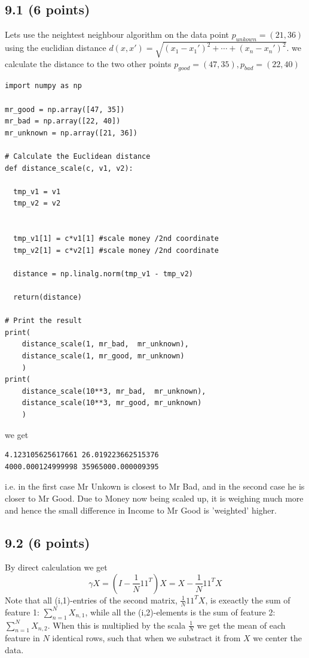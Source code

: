 \documentclass[a4paper,12pt]{article}
\begin{document}
\subsection{9.1 (6 points)}
Lets use the neightest neighbour algorithm on the data point $p_{unkown} = (21, 36)$
using the euclidian distance $d(x,x') = \sqrt{(x_1 - x_1')^2 + \cdots + (x_n - x_n')^2}$. we calculate the distance to the two other points $p_{good} = (47, 35), p_{bad} = (22, 40)$

\begin{lstlisting}
import numpy as np

mr_good = np.array([47, 35])
mr_bad = np.array([22, 40])
mr_unknown = np.array([21, 36])

# Calculate the Euclidean distance
def distance_scale(c, v1, v2):

  tmp_v1 = v1
  tmp_v2 = v2


  tmp_v1[1] = c*v1[1] #scale money /2nd coordinate
  tmp_v2[1] = c*v2[1] #scale money /2nd coordinate
  
  distance = np.linalg.norm(tmp_v1 - tmp_v2)

  return(distance)

# Print the result
print(
    distance_scale(1, mr_bad,  mr_unknown),
    distance_scale(1, mr_good, mr_unknown)
    )
print(
    distance_scale(10**3, mr_bad,  mr_unknown),
    distance_scale(10**3, mr_good, mr_unknown)
    )
\end{lstlisting}

we get
\begin{lstlisting}
4.123105625617661 26.019223662515376
4000.000124999998 35965000.000009395
\end{lstlisting}

i.e. in the first case Mr Unkown is closest to Mr Bad, and in the second case he is closer to Mr Good. Due to Money now being scaled up, it is weighing much more and hence the small difference in Income to Mr Good is 'weighted' higher.



\subsection{9.2 (6 points)}
By direct calculation we get
$$
\gamma X = (I - \frac{1}{N}11^T)X = X- \frac{1}{N}11^TX
$$
Note that all (i,1)-entries of the second matrix, $\frac{1}{N}11^TX$, is exeactly the sum of feature 1: $\sum_{n = 1}^N X_{n,1}$, while all the (i,2)-elements is the sum of feature 2: $\sum_{n = 1}^N X_{n,2}$. When this is multiplied by the scala $\frac{1}{N}$ we get the mean of each feature in $N$ identical rows, such that when we substract it from $X$ we center the data.
\end{document}
